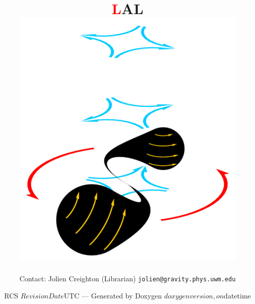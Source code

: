 \documentclass{article}
\def\rcs#1{\def\next##1#1{\mbox{##1}}\next}
\begin{document}



\title{
\sffamily\bfseries\Huge
\textcolor{red}{\lsdfont L}AL
\hspace{-2em}
\\[\bigskipamount]
\includegraphics[height=5in]{merger}
}
\author{Contact: Jolien Creighton (Librarian) \texttt{jolien@gravity.phys.uwm.edu}}
\date{RCS \rcs$Revision$\rcs$Date$UTC ---
Generated by Doxygen $doxygenversion, on $datetime}

\maketitle

\newpage
\nopagebreak
\tableofcontents

\clearemptydoublepage
{}
\end{document}
